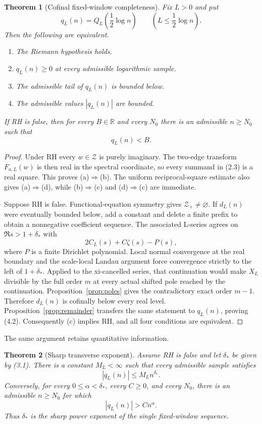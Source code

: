 \documentclass[11pt]{article}
\newtheorem{theorem}{Theorem}[section]
\newcommand{\R}{\mathbb R}
\newcommand{\cZ}{\mathcal Z}
\begin{document}
\begin{theorem}[Cofinal fixed-window completeness]\label{thm:completeness}
Fix $L>0$ and put
\[
  q_L(n)=Q_L\!\left(\frac12\log n\right)
  \qquad\left(L\le\frac12\log n\right).
  \tag{4.1}
\]
Then the following are equivalent.
\begin{enumerate}[label=(\alph*)]
\item The Riemann hypothesis holds.
\item $q_L(n)\ge0$ at every admissible logarithmic sample.
\item The admissible tail of $q_L(n)$ is bounded below.
\item The admissible values $|q_L(n)|$ are bounded.
\end{enumerate}
If RH is false, then for every $B\in\R$ and every $N_0$ there is an admissible $n\ge N_0$ such
that
\[
  q_L(n)<B.
  \tag{4.2}
\]
\end{theorem}

\begin{proof}
Under RH every $w\in\cZ$ is purely imaginary.  The two-edge transform $F_{a,L}(w)$ is then real
in the spectral coordinate, so every summand in (2.3) is a real square.  This proves (a)$\Rightarrow$(b).
The uniform reciprocal-square estimate also gives (a)$\Rightarrow$(d), while (b)$\Rightarrow$(c)
and (d)$\Rightarrow$(c) are immediate.

Suppose RH is false.  Functional-equation symmetry gives $\cZ_+\ne\varnothing$.  If $d_L(n)$
were eventually bounded below, add a constant and delete a finite prefix to obtain a nonnegative
coefficient sequence.  The associated L-series agrees on $\Re s>1+\delta_*$ with
\[
  2C_L(s)+C\zeta(s)-P(s),
  \tag{4.3}
\]
where $P$ is a finite Dirichlet polynomial.  Local normal convergence at the real boundary and
the scale-local Landau argument force convergence strictly to the left of $1+\delta_*$.  Applied
to the xi-cancelled series, that continuation would make $X_L$ divisible by the full order $m$
at every actual shifted pole reached by the continuation.  Proposition~\ref{prop:poles} gives
the contradictory exact order $m-1$.  Therefore $d_L(n)$ is cofinally below every real level.
Proposition~\ref{prop:remainder} transfers the same statement to $q_L(n)$, proving (4.2).
Consequently (c) implies RH, and all four conditions are equivalent.
\end{proof}

The same argument retains quantitative information.

\begin{theorem}[Sharp transverse exponent]\label{thm:exponent}
Assume RH is false and let $\delta_*$ be given by (3.1).  There is a constant $M_L<\infty$ such
that every admissible sample satisfies
\[
  |q_L(n)|\le M_L n^{\delta_*}.
  \tag{4.4}
\]
Conversely, for every $0\le\alpha<\delta_*$, every $C\ge0$, and every $N_0$, there is an
admissible $n\ge N_0$ for which
\[
  |q_L(n)|>Cn^\alpha.
  \tag{4.5}
\]
Thus $\delta_*$ is the sharp power exponent of the single fixed-window sequence.
\end{theorem}
\end{document}

